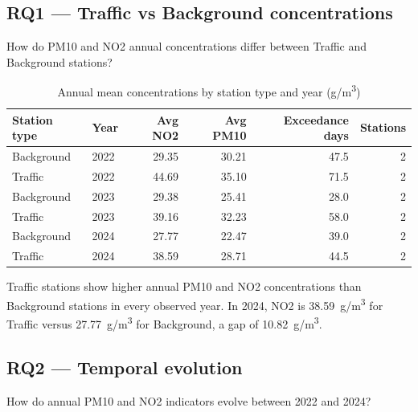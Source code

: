 \documentclass[11pt,a4paper]{article}
\begin{document}
\subsection{RQ1 --- Traffic vs Background concentrations}

\begin{tcolorbox}[rqbox,title=Research Question 1]
How do PM10 and NO2 annual concentrations differ between Traffic and Background stations?
\end{tcolorbox}

\begin{table}[h!]
\centering
\caption{Annual mean concentrations by station type and year (\textmu g/m\textsuperscript{3})}
\small
{}
\begin{tabular}{@{}llrrrr@{}}
\toprule
\textbf{Station type} & \textbf{Year} & \textbf{Avg NO2} & \textbf{Avg PM10} & \textbf{Exceedance days} & \textbf{Stations} \\
\midrule
Background & 2022 & 29.35 & 30.21 &  47.5 & 2 \\
Traffic    & 2022 & 44.69 & 35.10 &  71.5 & 2 \\
Background & 2023 & 29.38 & 25.41 &  28.0 & 2 \\
Traffic    & 2023 & 39.16 & 32.23 &  58.0 & 2 \\
Background & 2024 & 27.77 & 22.47 &  39.0 & 2 \\
Traffic    & 2024 & 38.59 & 28.71 &  44.5 & 2 \\
\bottomrule
\end{tabular}
\end{table}

\begin{tcolorbox}[answerbox,title=Direct answer --- RQ1]
Traffic stations show higher annual PM10 and NO2 concentrations than Background stations in
every observed year. In 2024, NO2 is 38.59~\textmu g/m\textsuperscript{3} for Traffic versus
27.77~\textmu g/m\textsuperscript{3} for Background, a gap of 10.82~\textmu g/m\textsuperscript{3}.
\end{tcolorbox}

\subsection{RQ2 --- Temporal evolution}

\begin{tcolorbox}[rqbox,title=Research Question 2]
How do annual PM10 and NO2 indicators evolve between 2022 and 2024?
\end{tcolorbox}
\end{document}

